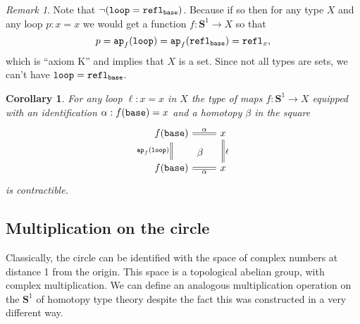 \documentclass{amsart}
\theoremstyle{theorem}
\newtheorem*{cor}{Corollary}
\theoremstyle{definition}
\theoremstyle{remark}
\newtheorem*{rmk}{Remark}
\newcommand{\0}{\mathbbe{0}}
\newcommand{\1}{\mathbbe{1}}
\newcommand{\2}{\mathbbe{2}}
\newcommand{\3}{\mathbbe{3}}
\newcommand{\4}{\mathbbe{4}}
\newcommand{\term}[1]{{\textup{\texttt{#1}}}}
\newcommand{\refl}{\term{refl}}
\newcommand{\ap}{\term{ap}}
\newcommand{\Sone}{\mathbf{S}^1}
\newcommand{\base}{\term{base}}
\newcommand{\lloop}{\term{loop}}
\begin{document}
  \begin{rmk}
    Note that $\neg(\lloop = \refl_\base)$. Because if so then for any type $X$ and any loop $p : x = x$ we would get a function $f : \Sone \to X$ so that
    \[ p = \ap_f(\lloop) = \ap_f(\refl_\base) = \refl_x,\]
    which is ``axiom K'' and implies that $X$ is a set. Since not all types are sets, we can't have $\lloop = \refl_\base$.
  \end{rmk}
  

  \begin{cor} For any loop $\ell : x = x$ in $X$ the type of maps $f : \Sone \to X$ equipped with an identification $\alpha : f(\base) =x$ and a homotopy $\beta$ in the square
    \[
      \begin{tikzcd}
        f(\base)\arrow[dr, phantom, "\beta"] \arrow[d, equals, "\ap_f(\lloop)"'] \arrow[r, equals, "\alpha"] & x \arrow[d, "\ell", equals] \\ f(\base) \arrow[r, equals, "\alpha"'] & x
      \end{tikzcd}\]
      is contractible.
    \end{cor}

    \subsection*{Multiplication on the circle}

Classically, the circle can be identified with the space of complex numbers at distance 1 from the origin. This space is a topological abelian group, with complex multiplication. We can define an analogous multiplication operation on the $\Sone$ of homotopy type theory despite the fact this was constructed in a very different way.
\end{document}
